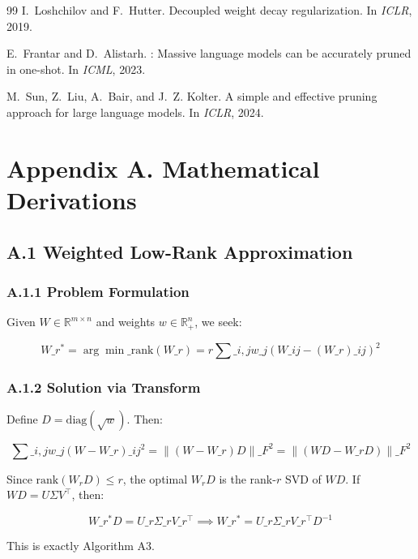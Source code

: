 \begin{thebibliography}{99}
I.~Loshchilov and F.~Hutter.
\newblock Decoupled weight decay regularization.
\newblock In \emph{ICLR}, 2019.

E.~Frantar and D.~Alistarh.
: Massive language models can be accurately pruned in one-shot.
\newblock In \emph{ICML}, 2023.

M.~Sun, Z.~Liu, A.~Bair, and J.~Z. Kolter.
\newblock A simple and effective pruning approach for large language models.
\newblock In \emph{ICLR}, 2024.

\end{thebibliography}


\section{Appendix A. Mathematical Derivations}

\subsection{A.1 Weighted Low-Rank Approximation}

\subsubsection{A.1.1 Problem Formulation}

Given $W \in \mathbb{R}^{m \times n}$ and weights $w \in \mathbb{R}_+^n$, 
we seek:

\[
W\_r^* = \arg\min\_{\text{rank}(W\_r) = r} \sum\_{i, j} w\_j (W\_{ij} - (W\_r)\_{ij})^2
\tag{A.1}
\]

\subsubsection{A.1.2 Solution via Transform}

Define $D = \mathrm{diag}(\sqrt{w})$. Then:

\[
\sum\_{i, j} w\_j (W - W\_r)\_{ij}^2 = \|(W - W\_r) D\|\_F^2 = \|(W D - W\_r D)\|\_F^2
\tag{A.2}
\]

Since $\text{rank}(W_r D) \leq r$, the optimal $W_r D$ is the rank-$r$ SVD 
of $W D$. If $W D = U \Sigma V^\top$, then:

\[
W\_r^* D = U\_r \Sigma\_r V\_r^\top \implies W\_r^* = U\_r \Sigma\_r V\_r^\top D^{-1}
\tag{A.3}
\]

This is exactly Algorithm A3.

